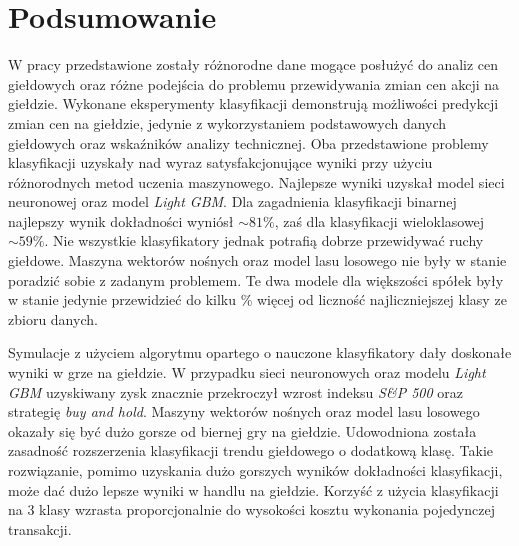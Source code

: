 \documentclass[a4paper, twoside, 11pt, openright]{article}
\begin{document}
\newpage 
 
\section{Podsumowanie}

W pracy przedstawione zostały różnorodne dane mogące posłużyć do analiz cen giełdowych oraz różne podejścia do problemu przewidywania zmian cen akcji na giełdzie. Wykonane eksperymenty klasyfikacji demonstrują możliwości predykcji zmian cen na giełdzie, jedynie z wykorzystaniem podstawowych danych giełdowych oraz wskaźników analizy technicznej. Oba przedstawione problemy klasyfikacji uzyskały nad wyraz satysfakcjonujące wyniki przy użyciu różnorodnych metod uczenia maszynowego. Najlepsze wyniki uzyskał model sieci neuronowej oraz model \textit{Light GBM}. Dla zagadnienia klasyfikacji binarnej najlepszy wynik dokładności wyniósł $\sim 81\%$, zaś dla klasyfikacji wieloklasowej $\sim 59\%$. Nie wszystkie klasyfikatory jednak potrafią dobrze przewidywać ruchy giełdowe. Maszyna wektorów nośnych oraz model lasu losowego nie były w stanie poradzić sobie z zadanym problemem. Te dwa modele dla większości spółek były w stanie jedynie przewidzieć do kilku \% więcej od liczność najliczniejszej klasy ze zbioru danych.

\bigskip

Symulacje z użyciem algorytmu opartego o nauczone klasyfikatory dały doskonałe wyniki w grze na giełdzie. W przypadku sieci neuronowych oraz modelu \textit{Light GBM} uzyskiwany zysk znacznie przekroczył wzrost indeksu \textit{S\&P 500} oraz strategię \textit{buy and hold}. Maszyny wektorów nośnych oraz model lasu losowego okazały się być dużo gorsze od biernej gry na giełdzie. Udowodniona została zasadność rozszerzenia klasyfikacji trendu giełdowego o dodatkową klasę. Takie rozwiązanie, pomimo uzyskania dużo gorszych wyników dokładności klasyfikacji, może dać dużo lepsze wyniki w handlu na giełdzie. Korzyść z użycia klasyfikacji na 3 klasy wzrasta proporcjonalnie do wysokości kosztu wykonania pojedynczej transakcji. 

\bigskip
\end{document}
